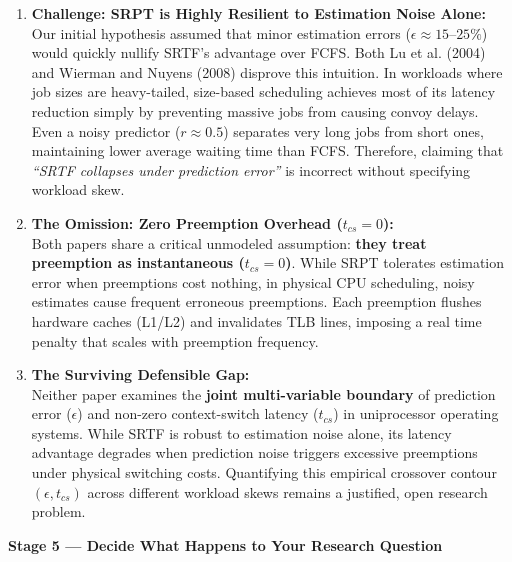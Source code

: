 \documentclass[11pt]{article}
\begin{document}
\begin{enumerate}[leftmargin=1.2em, itemsep=0.25em, parsep=0pt]
    \item \textbf{Challenge: SRPT is Highly Resilient to Estimation Noise Alone:} \\
    Our initial hypothesis assumed that minor estimation errors ($\epsilon \approx 15\text{--}25\%$) would quickly nullify SRTF's advantage over FCFS. Both Lu et al. (2004) and Wierman and Nuyens (2008) disprove this intuition. In workloads where job sizes are heavy-tailed, size-based scheduling achieves most of its latency reduction simply by preventing massive jobs from causing convoy delays. Even a noisy predictor ($r \approx 0.5$) separates very long jobs from short ones, maintaining lower average waiting time than FCFS. Therefore, claiming that \textit{``SRTF collapses under prediction error''} is incorrect without specifying workload skew.

    \item \textbf{The Omission: Zero Preemption Overhead ($t_{cs}=0$):} \\
    Both papers share a critical unmodeled assumption: \textbf{they treat preemption as instantaneous ($t_{cs}=0$)}. While SRPT tolerates estimation error when preemptions cost nothing, in physical CPU scheduling, noisy estimates cause frequent erroneous preemptions. Each preemption flushes hardware caches (L1/L2) and invalidates TLB lines, imposing a real time penalty that scales with preemption frequency.

    \item \textbf{The Surviving Defensible Gap:} \\
    Neither paper examines the \textbf{joint multi-variable boundary} of prediction error ($\epsilon$) and non-zero context-switch latency ($t_{cs}$) in uniprocessor operating systems. While SRTF is robust to estimation noise alone, its latency advantage degrades when prediction noise triggers excessive preemptions under physical switching costs. Quantifying this empirical crossover contour $(\epsilon, t_{cs})$ across different workload skews remains a justified, open research problem.
\end{enumerate}



\newpage
{\centering\fontsize{13}{16}\selectfont\textbf{Stage 5 --- Decide What Happens to Your Research Question}\par}
\vspace{0.4em}
\end{document}
